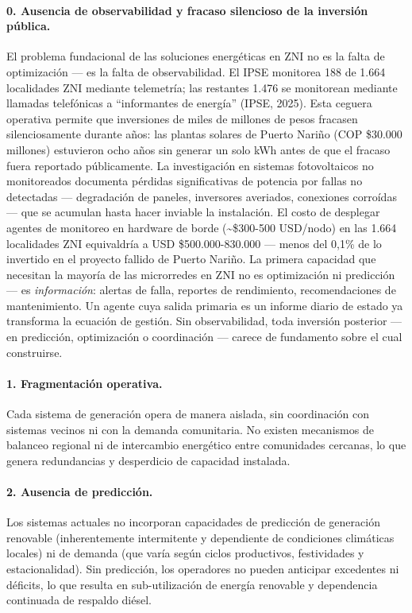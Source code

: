 \documentclass[12pt,letterpaper]{article}
\begin{document}
\paragraph{0. Ausencia de observabilidad y fracaso silencioso de la inversi\'on p\'ublica.}
El problema fundacional de las soluciones energ\'eticas en ZNI no es la falta de optimizaci\'on --- es la falta de observabilidad. El IPSE monitorea 188 de 1.664 localidades ZNI mediante telemetr\'ia; las restantes 1.476 se monitorean mediante llamadas telef\'onicas a ``informantes de energ\'ia'' (IPSE, 2025). Esta ceguera operativa permite que inversiones de miles de millones de pesos fracasen silenciosamente durante a\~nos: las plantas solares de Puerto Nari\~no (COP \$30.000 millones) estuvieron ocho a\~nos sin generar un solo kWh antes de que el fracaso fuera reportado p\'ublicamente. La investigaci\'on en sistemas fotovoltaicos no monitoreados documenta p\'erdidas significativas de potencia por fallas no detectadas --- degradaci\'on de paneles, inversores averiados, conexiones corro\'idas --- que se acumulan hasta hacer inviable la instalaci\'on. El costo de desplegar agentes de monitoreo en hardware de borde (\textasciitilde\$300-500 USD/nodo) en las 1.664 localidades ZNI equivaldr\'ia a USD \$500.000-830.000 --- menos del 0,1\% de lo invertido en el proyecto fallido de Puerto Nari\~no. La primera capacidad que necesitan la mayor\'ia de las microrredes en ZNI no es optimizaci\'on ni predicci\'on --- es \textit{informaci\'on}: alertas de falla, reportes de rendimiento, recomendaciones de mantenimiento. Un agente cuya salida primaria es un informe diario de estado ya transforma la ecuaci\'on de gesti\'on. Sin observabilidad, toda inversi\'on posterior --- en predicci\'on, optimizaci\'on o coordinaci\'on --- carece de fundamento sobre el cual construirse.

\paragraph{1. Fragmentaci\'on operativa.}
Cada sistema de generaci\'on opera de manera aislada, sin coordinaci\'on con sistemas vecinos ni con la demanda comunitaria. No existen mecanismos de balanceo regional ni de intercambio energ\'etico entre comunidades cercanas, lo que genera redundancias y desperdicio de capacidad instalada.

\paragraph{2. Ausencia de predicci\'on.}
Los sistemas actuales no incorporan capacidades de predicci\'on de generaci\'on renovable (inherentemente intermitente y dependiente de condiciones clim\'aticas locales) ni de demanda (que var\'ia seg\'un ciclos productivos, festividades y estacionalidad). Sin predicci\'on, los operadores no pueden anticipar excedentes ni d\'eficits, lo que resulta en sub-utilizaci\'on de energ\'ia renovable y dependencia continuada de respaldo di\'esel.
\end{document}
